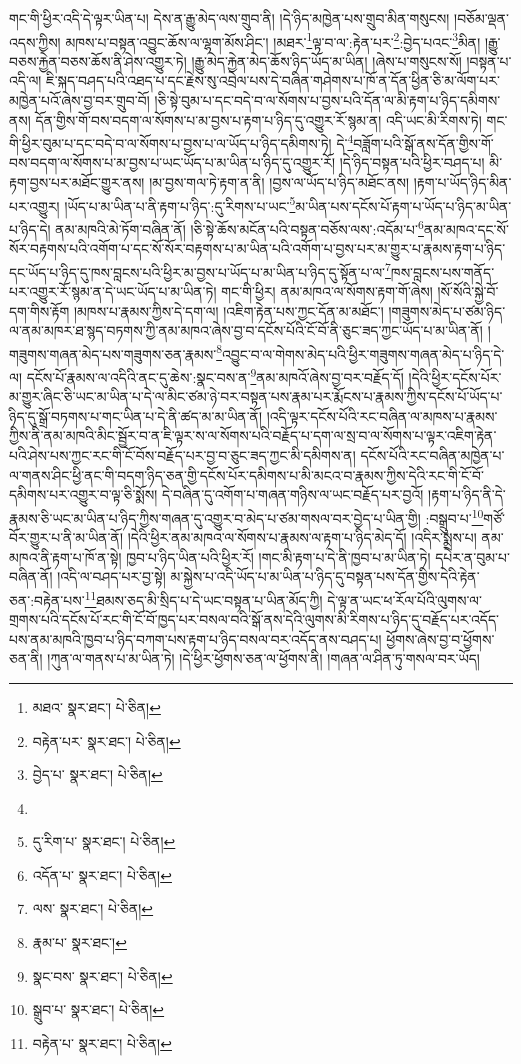 གང་གི་ཕྱིར་འདི་དེ་ལྟར་ཡིན་པ། དེས་ན་རྒྱུ་མེད་ལས་གྲུབ་ནི། །དེ་ཉིད་མཁྱེན་པས་གྲུབ་མིན་གསུངས། །བཅོམ་ལྡན་འདས་ཀྱིས། མཁས་པ་བསྟན་འབྱུང་ཆོས་ལ་ལྷག་མོས་ཤིང་། །མཐར་\footnote{མཐའ་  སྣར་ཐང་།  པེ་ཅིན། }ལྟ་བ་ལ་:རྟེན་པར་\footnote{བརྟེན་པར་  སྣར་ཐང་།  པེ་ཅིན། }:བྱེད་པའང་\footnote{བྱེད་པ་  སྣར་ཐང་།  པེ་ཅིན། }མིན། །རྒྱུ་བཅས་རྐྱེན་བཅས་ཆོས་ནི་ཤེས་འགྱུར་ཏེ། །རྒྱུ་མེད་རྐྱེན་མེད་ཆོས་ཉིད་ཡོད་མ་ཡིན། །ཞེས་པ་གསུངས་སོ། །བསྟན་པ་འདི་ལ། ཇི་སྐད་བཤད་པའི་འཐད་པ་དང་རྗེས་སུ་འབྲེལ་པས་དེ་བཞིན་གཤེགས་པ་ཁོ་ན་དོན་ཕྱིན་ཅི་མ་ལོག་པར་མཁྱེན་པའོ་ཞེས་བྱ་བར་གྲུབ་བོ། །ཅི་སྟེ་བུམ་པ་དང་བདེ་བ་ལ་སོགས་པ་བྱས་པའི་དོན་ལ་མི་རྟག་པ་ཉིད་དམིགས་ནས། དོན་གྱིས་གོ་བས་བདག་ལ་སོགས་པ་མ་བྱས་པ་རྟག་པ་ཉིད་དུ་འགྱུར་རོ་སྙམ་ན། འདི་ཡང་མི་རིགས་ཏེ། གང་གི་ཕྱིར་བུམ་པ་དང་བདེ་བ་ལ་སོགས་པ་བྱས་པ་ལ་ཡོད་པ་ཉིད་དམིགས་ཏེ། དེ་\footnote{}བཟློག་པའི་སྒོ་ནས་དོན་གྱིས་གོ་བས་བདག་ལ་སོགས་པ་མ་བྱས་པ་ཡང་ཡོད་པ་མ་ཡིན་པ་ཉིད་དུ་འགྱུར་རོ། །དེ་ཉིད་བསྟན་པའི་ཕྱིར་བཤད་པ། མི་རྟག་བྱས་པར་མཐོང་གྱུར་ནས། །མ་བྱས་གལ་ཏེ་རྟག་ན་ནི། །བྱས་ལ་ཡོད་པ་ཉིད་མཐོང་ནས། །རྟག་པ་ཡོད་ཉིད་མིན་པར་འགྱུར། །ཡོད་པ་མ་ཡིན་པ་ནི་རྟག་པ་ཉིད་:དུ་རིགས་པ་ཡང་\footnote{དུ་རིག་པ་  སྣར་ཐང་།  པེ་ཅིན། }མ་ཡིན་པས་དངོས་པོ་རྟག་པ་ཡོད་པ་ཉིད་མ་ཡིན་པ་ཉིད་དེ། ནམ་མཁའི་མེ་ཏོག་བཞིན་ནོ། །ཅི་སྟེ་ཆོས་མངོན་པའི་བསྟན་བཅོས་ལས་:འདོམ་པ་\footnote{འདོན་པ་  སྣར་ཐང་།  པེ་ཅིན། }ནམ་མཁའ་དང་སོ་སོར་བརྟགས་པའི་འགོག་པ་དང་སོ་སོར་བརྟགས་པ་མ་ཡིན་པའི་འགོག་པ་བྱས་པར་མ་གྱུར་པ་རྣམས་རྟག་པ་ཉིད་དང་ཡོད་པ་ཉིད་དུ་ཁས་བླངས་པའི་ཕྱིར་མ་བྱས་པ་ཡོད་པ་མ་ཡིན་པ་ཉིད་དུ་སྟོན་པ་ལ་\footnote{ལས་  སྣར་ཐང་།  པེ་ཅིན། }ཁས་བླངས་པས་གནོད་པར་འགྱུར་རོ་སྙམ་ན་དེ་ཡང་ཡོད་པ་མ་ཡིན་ཏེ། གང་གི་ཕྱིར། ནམ་མཁའ་ལ་སོགས་རྟག་གོ་ཞེས། །སོ་སོའི་སྐྱེ་བོ་དག་གིས་རྟོག །མཁས་པ་རྣམས་ཀྱིས་དེ་དག་ལ། །འཇིག་རྟེན་པས་ཀྱང་དོན་མ་མཐོང་། །གཟུགས་མེད་པ་ཙམ་ཉིད་ལ་ནམ་མཁར་ཐ་སྙད་བཏགས་ཀྱི་ནམ་མཁའ་ཞེས་བྱ་བ་དངོས་པོའི་ངོ་བོ་ནི་ཅུང་ཟད་ཀྱང་ཡོད་པ་མ་ཡིན་ནོ། །གཟུགས་གཞན་མེད་པས་གཟུགས་ཅན་རྣམས་\footnote{རྣམ་པ་  སྣར་ཐང་། }འབྱུང་བ་ལ་གེགས་མེད་པའི་ཕྱིར་གཟུགས་གཞན་མེད་པ་ཉིད་དེ་ལ། དངོས་པོ་རྣམས་ལ་འདིའི་ནང་དུ་ཆེས་:སྣང་བས་ན་\footnote{སྣང་བས་  སྣར་ཐང་།  པེ་ཅིན། }ནམ་མཁའོ་ཞེས་བྱ་བར་བརྗོད་དོ། །དེའི་ཕྱིར་དངོས་པོར་མ་གྱུར་ཞིང་ཅི་ཡང་མ་ཡིན་པ་དེ་ལ་མིང་ཙམ་ཉེ་བར་བསྟན་པས་རྣམ་པར་རྨོངས་པ་རྣམས་ཀྱིས་དངོས་པོ་ཡོད་པ་ཉིད་དུ་སྒྲོ་བཏགས་པ་གང་ཡིན་པ་དེ་ནི་ཚད་མ་མ་ཡིན་ནོ། །འདི་ལྟར་དངོས་པོའི་རང་བཞིན་ལ་མཁས་པ་རྣམས་ཀྱིས་ནི་ནམ་མཁའི་མིང་སྦྱོར་བ་ན་ཇི་ལྟར་ས་ལ་སོགས་པའི་བརྗོད་པ་དག་ལ་སྲ་བ་ལ་སོགས་པ་ལྟར་འཇིག་རྟེན་པའི་ཤེས་པས་ཀྱང་རང་གི་ངོ་བོས་བརྗོད་པར་བྱ་བ་ཅུང་ཟད་ཀྱང་མི་དམིགས་ན། དངོས་པོའི་རང་བཞིན་མཁྱེན་པ་ལ་གནས་ཤིང་ཕྱི་ནང་གི་བདག་ཉིད་ཅན་གྱི་དངོས་པོར་དམིགས་པ་མི་མངའ་བ་རྣམས་ཀྱིས་དེའི་རང་གི་ངོ་བོ་དམིགས་པར་འགྱུར་བ་ལྟ་ཅི་སྨོས། དེ་བཞིན་དུ་འགོག་པ་གཞན་གཉིས་ལ་ཡང་བརྗོད་པར་བྱའོ། །རྟག་པ་ཉིད་ནི་དེ་རྣམས་ཅི་ཡང་མ་ཡིན་པ་ཉིད་ཀྱིས་གཞན་དུ་འགྱུར་བ་མེད་པ་ཙམ་གསལ་བར་བྱེད་པ་ཡིན་གྱི། :བསྒྲུབ་པ་\footnote{སྒྲུབ་པ་  སྣར་ཐང་།  པེ་ཅིན། }གཙོ་བོར་གྱུར་པ་ནི་མ་ཡིན་ནོ། །དེའི་ཕྱིར་ནམ་མཁའ་ལ་སོགས་པ་རྣམས་ལ་རྟག་པ་ཉིད་མེད་དོ། །འདིར་སྨྲས་པ། ནམ་མཁའ་ནི་རྟག་པ་ཁོ་ན་སྟེ། ཁྱབ་པ་ཉིད་ཡིན་པའི་ཕྱིར་རོ། །གང་མི་རྟག་པ་དེ་ནི་ཁྱབ་པ་མ་ཡིན་ཏེ། དཔེར་ན་བུམ་པ་བཞིན་ནོ། །འདི་ལ་བཤད་པར་བྱ་སྟེ། མ་སྐྱེས་པ་འདི་ཡོད་པ་མ་ཡིན་པ་ཉིད་དུ་བསྟན་པས་དོན་གྱིས་དེའི་རྟེན་ཅན་:བརྟེན་པས་\footnote{བརྟེན་པ་  སྣར་ཐང་།  པེ་ཅིན། }ཐམས་ཅད་མི་སྲིད་པ་དེ་ཡང་བསྟན་པ་ཡིན་མོད་ཀྱི། དེ་ལྟ་ན་ཡང་ཕ་རོལ་པོའི་ལུགས་ལ་གྲགས་པའི་དངོས་པོ་རང་གི་ངོ་བོ་ཁྱད་པར་བསལ་བའི་སྒོ་ནས་དེའི་ལུགས་མི་རིགས་པ་ཉིད་དུ་བརྗོད་པར་འདོད་པས་ནམ་མཁའི་ཁྱབ་པ་ཉིད་བཀག་པས་རྟག་པ་ཉིད་བསལ་བར་འདོད་ནས་བཤད་པ། ཕྱོགས་ཞེས་བྱ་བ་ཕྱོགས་ཅན་ནི། །ཀུན་ལ་གནས་པ་མ་ཡིན་ཏེ། །དེ་ཕྱིར་ཕྱོགས་ཅན་ལ་ཕྱོགས་ནི། །གཞན་ལ་ཤིན་ཏུ་གསལ་བར་ཡོད། 
